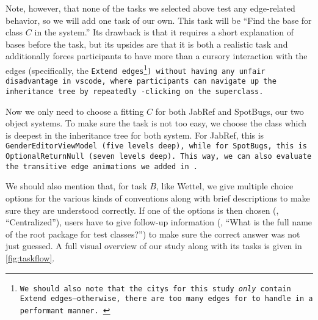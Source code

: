 \documentclass[../thesis]{subfiles}
\begin{document}
Note, however, that none of the tasks we selected above test any edge-related behavior, so we will add one task of our own.
This task will be \enquote{Find the \gls{base} for class $C$ in the system.}
Its drawback is that it requires a short explanation of \glspl{base} before the task, but its upsides are that it is both a realistic task and additionally forces participants to have more than a cursory interaction with the edges (specifically, the \tt{Extend} edges\footnote{
	We should also note that the \glspl{city} for this study \emph{only} contain \tt{Extend} edges---otherwise, there are too many edges for \SEE{} to handle in a performant manner.
}) without having any unfair disadvantage in \gls{vscode}, where participants can navigate up the inheritance tree by repeatedly -clicking on the superclass.

Now we only need to choose a fitting $C$ for both JabRef and SpotBugs, our two object systems.
To make sure the task is not too easy, we choose the class which is deepest in the inheritance tree for both system.
For JabRef, this is \tt{GenderEditorViewModel} (five levels deep), while for SpotBugs, this is \tt{OptionalReturnNull} (seven levels deep).
This way, we can also evaluate the transitive edge animations we added in .

We should also mention that, for task $B$, like Wettel, we give multiple choice options for the various kinds of conventions along with brief descriptions to make sure they are understood correctly.
If one of the options is then chosen (\eg, \enquote{Centralized}), users have to give follow-up information (\eg, \enquote{What is the full name of the root package for test classes?}) to make sure the correct answer was not just guessed.
A full visual overview of our study along with its tasks is given in \cref{fig:taskflow}.
\end{document}
